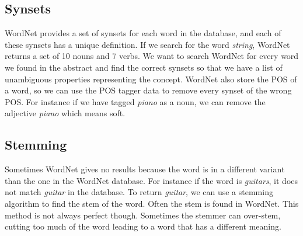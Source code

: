 
\subsection{Synsets}
WordNet provides a set of synsets for each word in the database, and each of these synsets has a unique definition. If we search for the word \emph{string}, WordNet returns a set of 10 nouns and 7 verbs. We want to search WordNet for every word we found in the abstract and find the correct synsets so that we have a list of unambiguous properties representing the concept. WordNet also store the POS of a word, so we can use the POS tagger data to remove every synset of the wrong POS. For instance if we have tagged \emph{piano} as a noun, we can remove the adjective \emph{piano} which means soft.

\subsection{Stemming}
Sometimes WordNet gives no results because the word is in a different variant than the one in the WordNet database. For instance if the word is \emph{guitars}, it does not match \emph{guitar} in the database. To return \emph{guitar}, we can use a stemming algorithm to find the stem of the word. Often the stem is found in WordNet. This method is not always perfect though. Sometimes the stemmer can over-stem, cutting too much of the word leading to a word that has a different meaning. %


